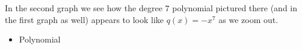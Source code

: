 \documentclass{ximera}
\begin{document}
In the second graph we see how the degree $7$ polynomial pictured there (and in the first graph as well) appears to look like $q(x) = -x^7$ as we zoom out.%


\begin{summary}\begin{itemize}
\item Polynomial
\end{itemize}\end{summary}

 
%
\end{document}
